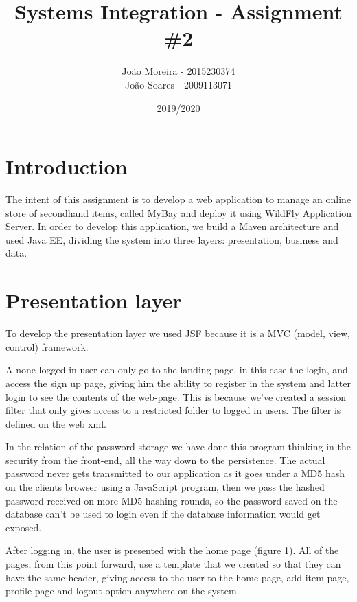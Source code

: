 \documentclass{article}
\title{Systems Integration - Assignment \#2}
\date{2019/2020}
\author{João Moreira - 2015230374 \\ 
João Soares - 2009113071 }
\begin{document}
\maketitle

\section{Introduction}

\qquad The intent of this assignment is to develop a web application to manage an online store of secondhand items, called MyBay and deploy it using WildFly Application Server. In order to develop this application, we build a Maven architecture and used \ac{Java EE}, dividing the system into three layers: presentation, business and data.

\section{Presentation layer}

\qquad To develop the presentation layer we used \ac{JSF} because it is a MVC (model, view, control) framework.

\qquad A none logged in user can only go to the landing page, in this case the login, and access the sign up page, giving him the ability to register in the system and latter login to see the contents of the web-page. This is because we've created a session filter that only gives access to a restricted folder to logged in users. The filter is defined on the web xml.

\qquad In the relation of the password storage we have done this program thinking in the security from the front-end, all the way down to the persistence. The actual password never gets transmitted to our application as it goes under a MD5 hash on the clients browser using a JavaScript program, then we pass the hashed password received on more MD5 hashing rounds, so the password saved on the database can't be used to login even if the database information would get exposed.

\qquad After logging in, the user is presented with the home page (figure 1). All of the pages, from this point forward, use a template that we created so that they can have the same header, giving access to the user to the home page, add item page, profile page and logout option anywhere on the system. 
\end{document}
